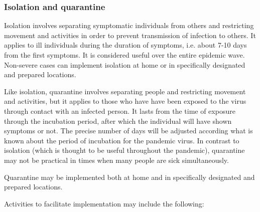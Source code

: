 \documentclass[12pt, a4]{scrartcl}
\begin{document}
\subsubsection{Isolation and quarantine}
Isolation involves separating symptomatic individuals from others and restricting movement and activities in order to prevent transmission of infection to others. It applies to ill individuals during the duration of symptoms, i.e. about 7-10 days from the first symptoms. It is considered useful over the entire epidemic wave. Non-severe cases can implement isolation at home or in specifically designated and prepared locations.

Like isolation, quarantine involves separating people and restricting movement and activities, but it applies to those who have have been exposed to the virus through contact with an infected person. It lasts from the time of exposure through the incubation period, after which the individual will have shown symptoms or not. The precise number of days will be adjusted according what is known about the period of incubation for the pandemic virus. In contrast to isolation (which is thought to be useful throughout the pandemic), quarantine may not be practical in times when many people are sick simultaneously. 

Quarantine may be implemented both at home and in specifically designated and prepared locations.

Activities to facilitate implementation may include the following:
\end{document}
